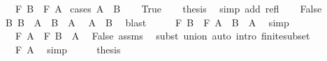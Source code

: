 \begin{isabellebody}
\ \ \ {\isachardoublequoteopen}F\ B\ \isactrlbold {\isasymle}\ F\ A{\isachardoublequoteclose}\isanewline
%
\isadelimproof
%
\endisadelimproof
%
\isatagproof
{}\isamarkupfalse%
\ {\isacharparenleft}{\kern0pt}cases\ {\isachardoublequoteopen}A\ {\isacharequal}{\kern0pt}\ B{\isachardoublequoteclose}{\isacharparenright}{\kern0pt}\isanewline
\ \ \isamarkupfalse%
\ True\ \isamarkupfalse%
\ \isamarkupfalse%
\ {\isacharquery}{\kern0pt}thesis\ \isamarkupfalse%
\ {\isacharparenleft}{\kern0pt}simp\ add{\isacharcolon}{\kern0pt}\ refl{\isacharparenright}{\kern0pt}\isanewline
{}\isamarkupfalse%
\isanewline
\ \ \isamarkupfalse%
\ False\isanewline
\ \ \isamarkupfalse%
\ B{\isacharcolon}{\kern0pt}\ {\isachardoublequoteopen}B\ {\isacharequal}{\kern0pt}\ A\ {\isasymunion}\ {\isacharparenleft}{\kern0pt}B\ {\isacharminus}{\kern0pt}\ A{\isacharparenright}{\kern0pt}{\isachardoublequoteclose}\ \isamarkupfalse%
\ {\isacartoucheopen}A\ {\isasymsubseteq}\ B{\isacartoucheclose}\ \isamarkupfalse%
\ blast\isanewline
\ \ \isamarkupfalse%
\ \isamarkupfalse%
\ {\isachardoublequoteopen}F\ B\ {\isacharequal}{\kern0pt}\ F\ {\isacharparenleft}{\kern0pt}A\ {\isasymunion}\ {\isacharparenleft}{\kern0pt}B\ {\isacharminus}{\kern0pt}\ A{\isacharparenright}{\kern0pt}{\isacharparenright}{\kern0pt}{\isachardoublequoteclose}\ \isamarkupfalse%
\ simp\isanewline
\ \ \isamarkupfalse%
\ \isamarkupfalse%
\ {\isachardoublequoteopen}{\isasymdots}\ {\isacharequal}{\kern0pt}\ F\ A\ \isactrlbold {\isacharasterisk}{\kern0pt}\ F\ {\isacharparenleft}{\kern0pt}B\ {\isacharminus}{\kern0pt}\ A{\isacharparenright}{\kern0pt}{\isachardoublequoteclose}\ \isamarkupfalse%
\ False\ assms\ \isamarkupfalse%
\ {\isacharparenleft}{\kern0pt}subst\ union{\isacharparenright}{\kern0pt}\ {\isacharparenleft}{\kern0pt}auto\ intro{\isacharcolon}{\kern0pt}\ finite{\isacharunderscore}{\kern0pt}subset{\isacharparenright}{\kern0pt}\isanewline
\ \ \isamarkupfalse%
\ \isamarkupfalse%
\ {\isachardoublequoteopen}{\isasymdots}\ \isactrlbold {\isasymle}\ F\ A{\isachardoublequoteclose}\ \isamarkupfalse%
\ simp\isanewline
\ \ \isamarkupfalse%
\ \isamarkupfalse%
\ {\isacharquery}{\kern0pt}thesis\ \isacommand{{\isachardot}{\kern0pt}}\isamarkupfalse%
\isanewline
{}\isamarkupfalse%

\end{isabellebody}
